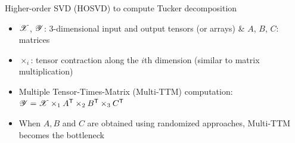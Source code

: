 \documentclass[aspectratio=169]{beamer}
\newcommand{\X}{\T{X}}
\newcommand{\Y}{\T{Y}}
\begin{document}
\begin{frame}{Higher-order SVD (HOSVD) to compute Tucker decomposition}
\begin{center}
{			\vspace*{-0.15cm}
			\begin{itemize}
				\item $\X$, $\Y$: 3-dimensional input and output tensors (or arrays) \& $A$, $B$, $C$: matrices
				\vfill
				\item $\times_i$: tensor contraction along the $i$th dimension (similar to matrix multiplication)
				\vfill
				\item Multiple Tensor-Times-Matrix (Multi-TTM) computation: $\Y = \X \times_1 A^\Tra \times_2 B^\Tra \times_3 C^\Tra$
				\vfill
				\item When $A, B$ and $C$ are obtained using randomized approaches, Multi-TTM becomes the bottleneck
			\end{itemize}
			\vfill
		}
	\end{center}
\end{frame}
\end{document}
